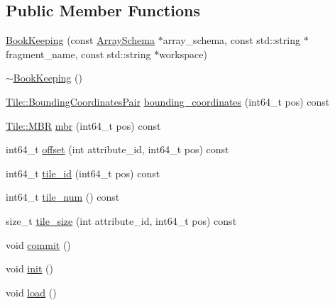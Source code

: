 \subsection*{Public Member Functions}
\begin{DoxyCompactItemize}
\item 
\hyperlink{classBookKeeping_a8595c4d1ca7e56014a0b04fb3b041213}{Book\+Keeping} (const \hyperlink{classArraySchema}{Array\+Schema} $\ast$array\+\_\+schema, const std\+::string $\ast$fragment\+\_\+name, const std\+::string $\ast$workspace)
\item 
\hyperlink{classBookKeeping_a2aff624077614b9ef635cc49d31707b8}{$\sim$\+Book\+Keeping} ()
\item 
\hyperlink{classTile_a7103069b7ba05d1032733e3a026b8632}{Tile\+::\+Bounding\+Coordinates\+Pair} \hyperlink{classBookKeeping_a82804443caeeeccfede04599d024763f}{bounding\+\_\+coordinates} (int64\+\_\+t pos) const 
\item 
\hyperlink{classTile_a0b0f911c937d339ce110c18a2d015a4d}{Tile\+::\+M\+B\+R} \hyperlink{classBookKeeping_a4fec5081fa77f259f7433d0e37e9b770}{mbr} (int64\+\_\+t pos) const 
\item 
int64\+\_\+t \hyperlink{classBookKeeping_a2559203a93884827e06c642ce7e9e794}{offset} (int attribute\+\_\+id, int64\+\_\+t pos) const 
\item 
int64\+\_\+t \hyperlink{classBookKeeping_a101732972f7263c9ce11a9887e85450e}{tile\+\_\+id} (int64\+\_\+t pos) const 
\item 
int64\+\_\+t \hyperlink{classBookKeeping_a18bae8de0d33a205d962321cafe8fc44}{tile\+\_\+num} () const 
\item 
size\+\_\+t \hyperlink{classBookKeeping_adc27911bdd3a8ce45a1f67806d14908d}{tile\+\_\+size} (int attribute\+\_\+id, int64\+\_\+t pos) const 
\item 
void \hyperlink{classBookKeeping_a08f736f8639a2c9fc92c12f11af05f57}{commit} ()
\item 
void \hyperlink{classBookKeeping_adbff76aeb3de9b8ec8d57cdbe29f1acb}{init} ()
\item 
void \hyperlink{classBookKeeping_a72a8fbb241e645215f338c307e97bde8}{load} ()
\end{DoxyCompactItemize}
